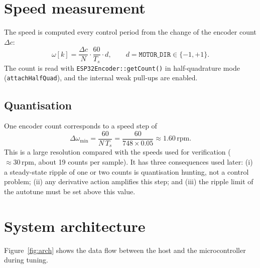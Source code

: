 \documentclass[11pt,a4paper]{report}
\newcommand{\code}[1]{\texttt{#1}}
\newcommand{\rpm}{\,\mathrm{rpm}}
\begin{document}
\section{Speed measurement}
The speed is computed every control period from the change of the encoder count $\Delta c$:
\begin{equation}
  \omega[k] = \frac{\Delta c}{N}\cdot\frac{60}{T_s}\cdot d,\qquad d = \texttt{MOTOR\_DIR}\in\{-1,+1\}. \label{eq:speed}
\end{equation}
The count is read with \code{ESP32Encoder::getCount()} in half-quadrature mode (\code{attachHalfQuad}), and the internal weak pull-ups are enabled.

\subsection*{Quantisation}
One encoder count corresponds to a speed step of
\begin{equation}
  \Delta\omega_{\min} = \frac{60}{N\,T_s} = \frac{60}{748\times0.05} \approx 1.60\rpm. \label{eq:quant}
\end{equation}
This is a large resolution compared with the speeds used for verification ($\approx 30\rpm$, about 19 counts per sample). It has three consequences used later: (i) a steady-state ripple of one or two counts is quantisation hunting, not a control problem; (ii) any derivative action amplifies this step; and (iii) the ripple limit of the autotune must be set above this value.


\section{System architecture}
Figure~\ref{fig:arch} shows the data flow between the host and the microcontroller during tuning.
\end{document}
